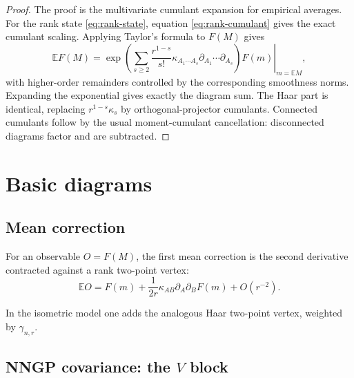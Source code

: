 \documentclass[11pt]{article}
\newcommand{\E}{\mathbb E}
\begin{document}
\begin{proof}
The proof is the multivariate cumulant expansion for empirical averages.  For the rank state \eqref{eq:rank-state}, equation \eqref{eq:rank-cumulant} gives the exact cumulant scaling.  Applying Taylor's formula to $F(M)$ gives
\begin{equation}
\E F(M)=\left.\exp\left(\sum_{s\ge2}\frac{r^{1-s}}{s!}\kappa_{A_1\cdots A_s}\partial_{A_1}\cdots\partial_{A_s}\right)F(m)\right|_{m=\E M},
\label{eq:edgeworth}
\end{equation}
with higher-order remainders controlled by the corresponding smoothness norms.  Expanding the exponential gives exactly the diagram sum.  The Haar part is identical, replacing $r^{1-s}\kappa_s$ by orthogonal-projector cumulants.  Connected cumulants follow by the usual moment-cumulant cancellation: disconnected diagrams factor and are subtracted.
\end{proof}

\section{Basic diagrams}

\subsection{Mean correction}

For an observable $O=F(M)$, the first mean correction is the second derivative contracted against a rank two-point vertex:
\begin{equation}
\E O=F(m)+\frac1{2r}\kappa_{AB}\partial_A\partial_BF(m)+O(r^{-2}).
\end{equation}

\begin{center}
\end{center}

In the isometric model one adds the analogous Haar two-point vertex, weighted by $\gamma_{n,r}$.

\subsection{NNGP covariance: the $V$ block}
\end{document}
